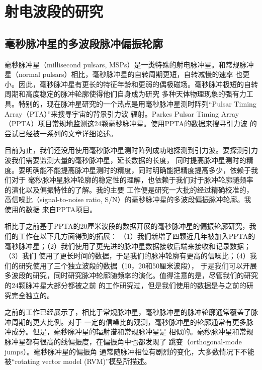
\chapter{射电波段的研究}

\section{毫秒脉冲星的多波段脉冲偏振轮廓}

毫秒脉冲星（millisecond pulsars, MSPs）是一类特殊的射电脉冲星。和常规脉冲星（normal pulsars）相比，毫秒脉冲星的自转周期更短，自转减慢的速率
也更小。因此，毫秒脉冲星有更长的特征年龄和更弱的偶极磁场。毫秒脉冲极短的自转周期和高度稳定的脉冲轮廓使得他们自身成为研究
多种天体物理现象的强有力工具。特别的，现在脉冲星研究的一个热点是用毫秒脉冲星测时阵列“Pulsar Timing Array（PTA）”来搜寻宇宙的背景引力波
辐射\supercite{Foster90}。Parkes Pulsar Timing Array（PPTA）项目常规地监测这24颗毫秒脉冲星。使用PPTA的数据来搜寻引力波
的尝试已经被一系列的文章详细论述\supercite{Shannon13b,Wang15,Zhu14}。

目前为止，我们还没用使用毫秒脉冲星测时阵列成功地探测到引力波。要探测引力波我们需要监测大量的毫秒脉冲星，延长数据的长度，
同时提高脉冲星测时的精度\supercite{Cordes12}。要明确能不能提高脉冲星测时的精度，同时明确能把精度提高多少，依赖于我们对于
毫秒脉冲星脉冲轮廓的稳定性的理解\supercite{Shannon14}，也依赖于我们对于脉冲轮廓随频率的演化以及偏振特性的了解。我的主要
工作便是研究一大批的经过精确校准的，高信噪比（signal-to-noise ratio, S/N）的毫秒脉冲星的多波段偏振脉冲轮廓。我使用的数据
来自PPTA项目。

相比于之前基于PPTA的20厘米波段的数据开展的毫秒脉冲星的偏振轮廓研究\supercite{Yan11a}，我们的工作在以下几方面得到的拓展：
（1）我们新增了四颗近几年被加入PPTA的毫秒脉冲星；（2）我们使用了更先进的脉冲星数据接收后端来接收和记录数据；（3）我们
使用了更长时间的数据，于是我们的脉冲轮廓有更高的信噪比；（4）我们的研究使用了三个独立波段的数据（10，20和50厘米波段），
于是我们可以开展多波段的研究，同时研究脉冲轮廓随频率的演化。值得注意的是，尽管我们的研究的24颗脉冲星大部分都被之前
的工作研究过，但是我们使用的数据是与之前的研究完全独立的。

之前的工作已经展示了，相比于常规脉冲星，毫秒脉冲星的脉冲轮廓通常覆盖了脉冲周期的更大比例。对于
一定的信噪比的观测，毫秒脉冲星的轮廓通常有更多脉冲成分\supercite{Yan11a}。但是，毫秒脉冲星的辐射谱和常规脉冲星是
相似的\supercite{Toscano98,Kramer98,Kramer99}。毫秒脉冲星和常规脉冲星都有很高的线偏振度，在偏振角中也都发现了
跳变（orthogonal-mode jumps）\supercite{Thorsett90,Navarro97,Stairs99,Manchester04,Ord04}。毫秒脉冲星的偏振角
通常随脉冲相位有剧烈的变化，大多数情况下不能被“rotating vector model (RVM)”模型所描述\supercite{Radhakrishnan69}。

